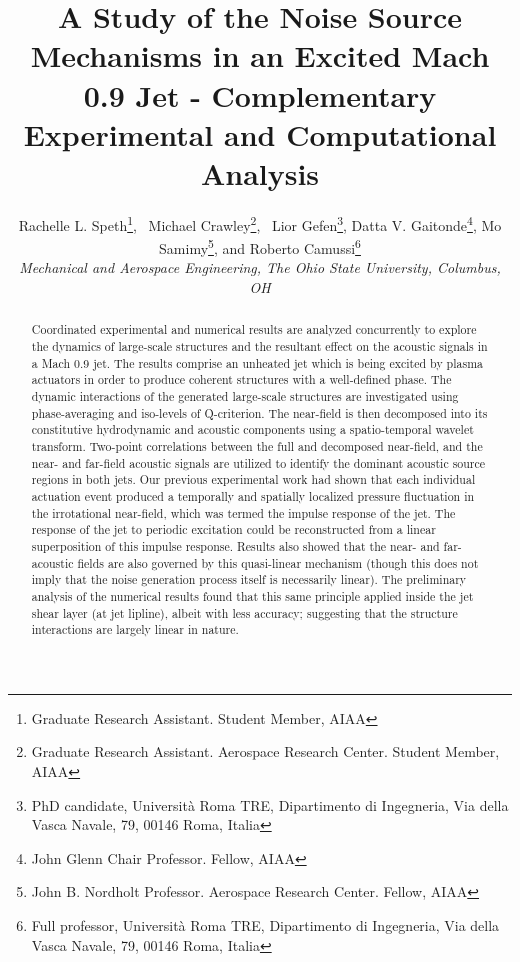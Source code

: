 \documentclass[english]{aiaa-tc}
\begin{document}
\title{A Study of the Noise Source Mechanisms in an Excited Mach 0.9 Jet - Complementary Experimental and Computational Analysis}


\author{Rachelle L. Speth\thanks{Graduate Research Assistant. Student Member, AIAA}, \
Michael Crawley\thanks{Graduate Research Assistant. Aerospace Research Center. Student Member, AIAA}, \
Lior Gefen\thanks{PhD candidate, Università Roma TRE, Dipartimento di Ingegneria, Via della Vasca Navale, 79, 00146 Roma, Italia},
 Datta V. Gaitonde\thanks{John Glenn Chair Professor. Fellow, AIAA},
 Mo Samimy\thanks{John B. Nordholt Professor. Aerospace Research Center. Fellow, AIAA},
 and Roberto Camussi\thanks{Full professor, Università Roma TRE, Dipartimento di Ingegneria, Via della Vasca Navale, 79, 00146 Roma, Italia}
\\\normalsize\itshape Mechanical and Aerospace Engineering, The Ohio State University, Columbus, OH \\}


\maketitle

\begin{abstract}
Coordinated experimental and numerical results are analyzed concurrently to explore the dynamics of large-scale structures and the resultant effect on the acoustic signals in a Mach 0.9 jet.
The results comprise an unheated jet which is being excited by plasma actuators in order to produce coherent structures with a well-defined phase.
The dynamic interactions of the generated large-scale structures are investigated using phase-averaging and iso-levels of Q-criterion.
The near-field is then decomposed into its constitutive hydrodynamic and acoustic components using a spatio-temporal wavelet transform.
Two-point correlations between the full and decomposed near-field, and the near- and far-field acoustic signals are utilized to identify the dominant acoustic source regions in both jets.
Our previous experimental work had shown that each individual actuation event produced a temporally and spatially localized pressure fluctuation in the irrotational near-field, which was termed the impulse response of the jet. The response of the jet to periodic excitation could be reconstructed from a linear superposition of this impulse response.
Results also showed that the near- and far-acoustic fields are also governed by this quasi-linear mechanism (though this does not imply that the noise generation process itself is necessarily linear).
The preliminary analysis of the numerical results found that this same principle applied inside the jet shear layer (at jet lipline), albeit with less accuracy; suggesting that the structure interactions are largely linear in nature.

\end{abstract}
\end{document}
